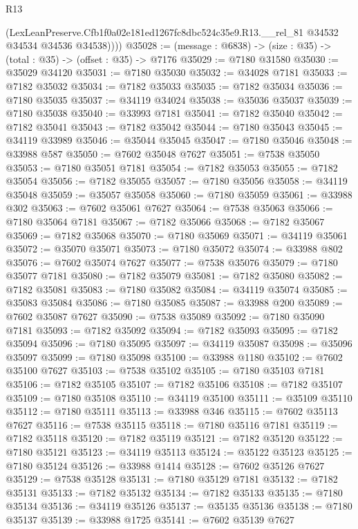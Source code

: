\begin{lexlean}{R13}
\begin{coremodule}
          (LexLeanPreserve.Cfb1f0a02e181ed1267fc8dbc524c35e9.R13.__rel_81
            @34532
            @34534
            @34536
            @34538))))
@35028 := (message : @6838) -> (size : @35) -> (total : @35) -> (offset : @35) -> @7176
@35029 := @7180 @31580
@35030 := @35029 @34120
@35031 := @7180 @35030
@35032 := @34028 @7181
@35033 := @7182 @35032
@35034 := @7182 @35033
@35035 := @7182 @35034
@35036 := @7180 @35035
@35037 := @34119 @34024
@35038 := @35036 @35037
@35039 := @7180 @35038
@35040 := @33993 @7181
@35041 := @7182 @35040
@35042 := @7182 @35041
@35043 := @7182 @35042
@35044 := @7180 @35043
@35045 := @34119 @33989
@35046 := @35044 @35045
@35047 := @7180 @35046
@35048 := @33988 @587
@35050 := @7602 @35048 @7627
@35051 := @7538 @35050
@35053 := @7180 @35051 @7181
@35054 := @7182 @35053
@35055 := @7182 @35054
@35056 := @7182 @35055
@35057 := @7180 @35056
@35058 := @34119 @35048
@35059 := @35057 @35058
@35060 := @7180 @35059
@35061 := @33988 @302
@35063 := @7602 @35061 @7627
@35064 := @7538 @35063
@35066 := @7180 @35064 @7181
@35067 := @7182 @35066
@35068 := @7182 @35067
@35069 := @7182 @35068
@35070 := @7180 @35069
@35071 := @34119 @35061
@35072 := @35070 @35071
@35073 := @7180 @35072
@35074 := @33988 @802
@35076 := @7602 @35074 @7627
@35077 := @7538 @35076
@35079 := @7180 @35077 @7181
@35080 := @7182 @35079
@35081 := @7182 @35080
@35082 := @7182 @35081
@35083 := @7180 @35082
@35084 := @34119 @35074
@35085 := @35083 @35084
@35086 := @7180 @35085
@35087 := @33988 @200
@35089 := @7602 @35087 @7627
@35090 := @7538 @35089
@35092 := @7180 @35090 @7181
@35093 := @7182 @35092
@35094 := @7182 @35093
@35095 := @7182 @35094
@35096 := @7180 @35095
@35097 := @34119 @35087
@35098 := @35096 @35097
@35099 := @7180 @35098
@35100 := @33988 @1180
@35102 := @7602 @35100 @7627
@35103 := @7538 @35102
@35105 := @7180 @35103 @7181
@35106 := @7182 @35105
@35107 := @7182 @35106
@35108 := @7182 @35107
@35109 := @7180 @35108
@35110 := @34119 @35100
@35111 := @35109 @35110
@35112 := @7180 @35111
@35113 := @33988 @346
@35115 := @7602 @35113 @7627
@35116 := @7538 @35115
@35118 := @7180 @35116 @7181
@35119 := @7182 @35118
@35120 := @7182 @35119
@35121 := @7182 @35120
@35122 := @7180 @35121
@35123 := @34119 @35113
@35124 := @35122 @35123
@35125 := @7180 @35124
@35126 := @33988 @1414
@35128 := @7602 @35126 @7627
@35129 := @7538 @35128
@35131 := @7180 @35129 @7181
@35132 := @7182 @35131
@35133 := @7182 @35132
@35134 := @7182 @35133
@35135 := @7180 @35134
@35136 := @34119 @35126
@35137 := @35135 @35136
@35138 := @7180 @35137
@35139 := @33988 @1725
@35141 := @7602 @35139 @7627

\end{coremodule}
\end{lexlean}

